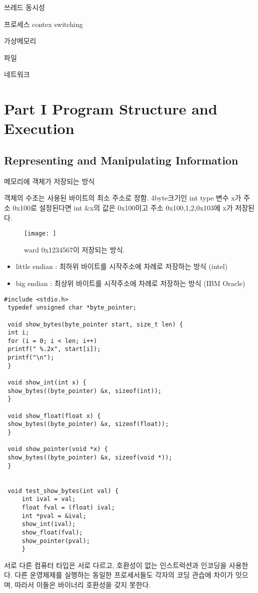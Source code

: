 쓰레드 동시성

프로세스 contex switching

가상메모리

파일

네트워크


\chapter{Part I Program Structure and Execution}

\section{Representing and Manipulating Information}



메모리에 객체가 저장되는 방식

객체의 수조는 사용된 바이트의 최소 주소로 정함.
4byte크기인 int type 변수 x가 주소 0x100로 설정된다면 int &x의 값은 0x100이고 주소 0x100,1,2,0x103에 x가 저장된다.


\begin{figure}[h!]
    \centering
    \texttt{[image: ]}
    \caption{ward 0x1234567이 저장되는 방식.}
\end{figure}


\begin{itemize}
    \item little endian :  최하위 바이트를 시작주소에 차례로 저장하는 방식 (intel)
    \item big endian : 최상위 바이트를 시작주소에 차례로 저장하는 방식 (IBM Oracle)
\end{itemize}


\begin{lstlisting}[style = CStyle]
 #include <stdio.h>
 typedef unsigned char *byte_pointer;

 void show_bytes(byte_pointer start, size_t len) {
 int i;
 for (i = 0; i < len; i++)
 printf(" %.2x", start[i]);
 printf("\n");
 }

 void show_int(int x) {
 show_bytes((byte_pointer) &x, sizeof(int));
 }

 void show_float(float x) {
 show_bytes((byte_pointer) &x, sizeof(float));
 }

 void show_pointer(void *x) {
 show_bytes((byte_pointer) &x, sizeof(void *));
 }


 void test_show_bytes(int val) {
     int ival = val;
     float fval = (float) ival;
     int *pval = &ival;
     show_int(ival);
     show_float(fval);
     show_pointer(pval);
     }

\end{lstlisting}
서로 다른 컴퓨터 타입은 서로 다르고, 호환성이 없는 인스트럭션과 인코딩을 사용한다. 다른 운영체제를 실행하는 동일한 프로세서들도 각자의 코딩 관습에 차이가 잇으며, 따라서 이들은 바이너리 호환성을 갖지 못한다.


